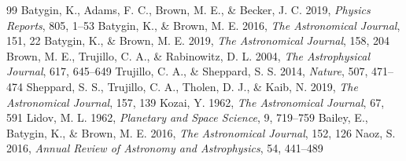 \documentclass[11pt,a4paper]{article}
\begin{document}
\begin{thebibliography}{99}
 Batygin, K., Adams, F. C., Brown, M. E., \& Becker, J. C. 2019, \textit{Physics Reports}, 805, 1--53
 Batygin, K., \& Brown, M. E. 2016, \textit{The Astronomical Journal}, 151, 22
 Batygin, K., \& Brown, M. E. 2019, \textit{The Astronomical Journal}, 158, 204
 Brown, M. E., Trujillo, C. A., \& Rabinowitz, D. L. 2004, \textit{The Astrophysical Journal}, 617, 645--649
 Trujillo, C. A., \& Sheppard, S. S. 2014, \textit{Nature}, 507, 471--474
 Sheppard, S. S., Trujillo, C. A., Tholen, D. J., \& Kaib, N. 2019, \textit{The Astronomical Journal}, 157, 139
 Kozai, Y. 1962, \textit{The Astronomical Journal}, 67, 591
 Lidov, M. L. 1962, \textit{Planetary and Space Science}, 9, 719--759
 Bailey, E., Batygin, K., \& Brown, M. E. 2016, \textit{The Astronomical Journal}, 152, 126
 Naoz, S. 2016, \textit{Annual Review of Astronomy and Astrophysics}, 54, 441--489
\end{thebibliography}
\end{document}
